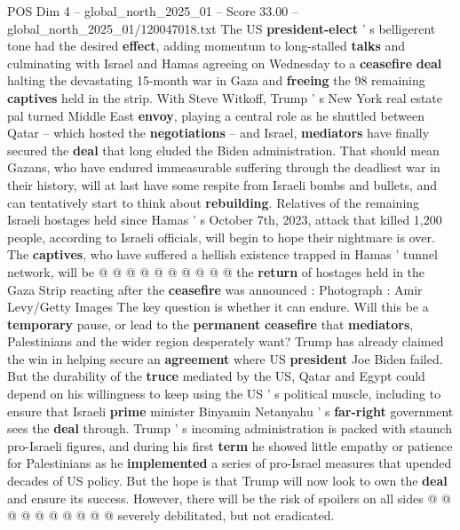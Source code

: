 \begin{textsample}{POS Dim 4 – global\_north\_2025\_01 – Score 33.00 – global\_north\_2025\_01/120047018.txt}  \label{ex:f4_pos_041}
The US \textbf{president-elect} ' s belligerent tone had the desired \textbf{effect}, adding momentum to long-stalled \textbf{talks} and culminating with Israel and Hamas agreeing on Wednesday to a \textbf{ceasefire} \textbf{deal} halting the devastating 15-month war in Gaza and \textbf{freeing} the 98 remaining \textbf{captives} held in the strip.
With Steve Witkoff, Trump ' s New York real estate pal turned Middle East \textbf{envoy}, playing a central role as he shuttled between Qatar -- which hosted the \textbf{negotiations} -- and Israel, \textbf{mediators} have finally secured the \textbf{deal} that long eluded the Biden administration.
That should mean Gazans, who have endured immeasurable suffering through the deadliest war in their history, will at last have some respite from Israeli bombs and bullets, and can tentatively start to think about \textbf{rebuilding}.
Relatives of the remaining Israeli hostages held since Hamas ' s October 7th, 2023, attack that killed 1,200 people, according to Israeli officials, will begin to hope their nightmare is over.
The \textbf{captives}, who have suffered a hellish existence trapped in Hamas ' tunnel network, will be @ @ @ @ @ @ @ @ @ @ the \textbf{return} of hostages held in the Gaza Strip reacting after the \textbf{ceasefire} was announced : Photograph : Amir Levy/Getty Images The key question is whether it can endure.
Will this be a \textbf{temporary} pause, or lead to the \textbf{permanent} \textbf{ceasefire} that \textbf{mediators}, Palestinians and the wider region desperately want?
Trump has already claimed the win in helping secure an \textbf{agreement} where US \textbf{president} Joe Biden failed.
But the durability of the \textbf{truce} mediated by the US, Qatar and Egypt could depend on his willingness to keep using the US ' s political muscle, including to ensure that Israeli \textbf{prime} minister Binyamin Netanyahu ' s \textbf{far-right} government sees the \textbf{deal} through.
Trump ' s incoming administration is packed with staunch pro-Israeli figures, and during his first \textbf{term} he showed little empathy or patience for Palestinians as he \textbf{implemented} a series of pro-Israel measures that upended decades of US policy.
But the hope is that Trump will now look to own the \textbf{deal} and ensure its success.
However, there will be the risk of spoilers on all sides @ @ @ @ @ @ @ @ @ @ severely debilitated, but not eradicated.

\end{textsample}
